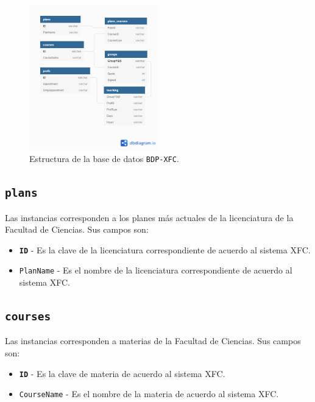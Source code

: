 \documentclass[twocolumn]{article}
\theoremstyle{definition}
\begin{document}
\begin{figure}
    \centering
    \includegraphics[width=0.5\textwidth]{fig/DB-relations.png}
    \caption{Estructura de la base de datos \texttt{BDP-XFC}.}
    \label{fig:estructura}
\end{figure}

\subsection{\texttt{plans}} 

Las instancias corresponden a los planes más actuales de la licenciatura de la Facultad de Ciencias. Sus campos son:

\begin{itemize}
    \item \texttt{\textbf{ID}} - Es la clave de la licenciatura correspondiente de acuerdo al sistema XFC.
    \item \texttt{PlanName} - Es el nombre de la licenciatura correspondiente de acuerdo al sistema XFC.
\end{itemize}

\subsection{\texttt{courses}} 

Las instancias corresponden a materias de la Facultad de Ciencias. Sus campos son:

\begin{itemize}
    \item \texttt{\textbf{ID}} - Es la clave de materia de acuerdo al sistema XFC.
    \item \texttt{CourseName} - Es el nombre de la materia de acuerdo al sistema XFC.
\end{itemize}
\end{document}

